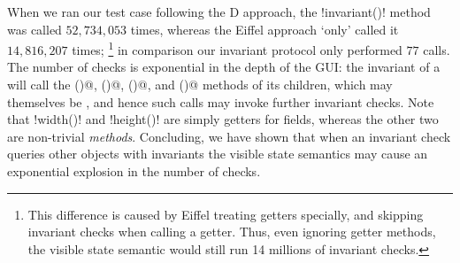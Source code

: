 When we ran our test case following the D approach, the \Q!invariant()! method was called $52,734,053$ times, whereas the Eiffel approach `only' called it $14,816,207$ times;%
\footnote{
This difference is caused by Eiffel treating getters specially, and skipping invariant checks when calling a getter.
Thus, even ignoring getter methods, the visible state semantic would still run 14 millions of invariant checks.
}%
in comparison our invariant protocol only performed $77$ calls. The number of checks is exponential in the depth of the GUI: the invariant of a \Q@SafeMovable@ will call the \Q@width()@, \Q@height()@, \Q@left()@, and \Q@top()@ methods of its children, which may themselves be \Q@SafeMovable@s, and hence such calls may invoke further invariant checks. Note that \Q!width()! and \Q!height()! are simply getters for fields, whereas the other two are non-trivial \emph{methods}.
Concluding, we have shown that when an invariant check queries other objects with invariants the visible state semantics may cause an exponential explosion in the number of checks.




